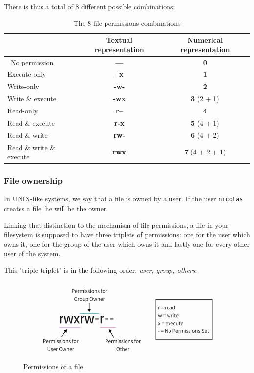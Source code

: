 \documentclass[12pt]{article}
\begin{document}
There is thus a total of 8 different possible combinations:
 
\begin{table}[ht]
\centering
\begin{tabular}[t]{lcc}
\toprule
&Textual representation &Numerical representation\\
\midrule\
No permission&\textbf{---}&\textbf{0}\\
Execute-only&\textbf{--x}&\textbf{1}\\
Write-only&\textbf{-w-}&\textbf{2}\\
Write \& execute&\textbf{-wx}&\textbf{3} (2 + 1)\\
Read-only&\textbf{r--}&\textbf{4}\\
Read \& execute&\textbf{r-x}&\textbf{5} (4 + 1)\\
Read \& write&\textbf{rw-}&\textbf{6} (4 + 2)\\
Read \& write \& execute&\textbf{rwx}&\textbf{7} (4 + 2 + 1)\\
\bottomrule
\end{tabular}
\caption{The 8 file permissions combinations}
\end{table}%

\subsubsection{File ownership}

In UNIX-like systems, we say that a file is owned by a user. If the user \texttt{nicolas} creates a file, he will be the owner.

Linking that distinction to the mechanism of file permissions, a file in your filesystem is supposed to have three triplets of permissions: one for the user which owns it, one for the group of the user which owns it and lastly one for every other user of the system.

This "triple triplet" is in the following order: \textit{user, group, others}.

\begin{figure}[!h]\centering\captionsetup{}
   \includegraphics[scale = 0.65]{resources/permissions.png}
   \caption{Permissions of a file}
\end{figure}
\end{document}
